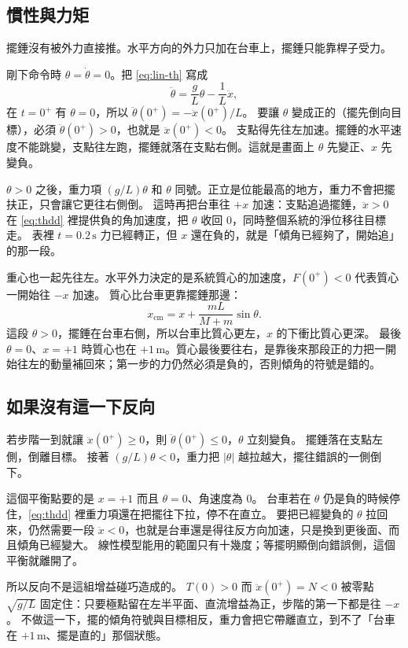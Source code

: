 \documentclass[12pt,a4paper]{article}
\begin{document}
\subsection{慣性與力矩}

擺錘沒有被外力直接推。水平方向的外力只加在台車上，擺錘只能靠桿子受力。

剛下命令時 \(\theta=\dot\theta=0\)。把 \eqref{eq:lin-th} 寫成
\begin{equation}
  \ddot\theta=\frac{g}{L}\theta-\frac{1}{L}\ddot x,
  \label{eq:thdd}
\end{equation}
在 \(t=0^+\) 有 \(\theta=0\)，所以 \(\ddot\theta(0^+)=-\ddot x(0^+)/L\)。
要讓 \(\theta\) 變成正的（擺先倒向目標），必須 \(\ddot\theta(0^+)>0\)，也就是 \(\ddot x(0^+)<0\)。
支點得先往左加速。擺錘的水平速度不能跳變，支點往左跑，擺錘就落在支點右側。這就是畫面上 \(\theta\) 先變正、\(x\) 先變負。

\(\theta>0\) 之後，重力項 \((g/L)\theta\) 和 \(\theta\) 同號。正立是位能最高的地方，重力不會把擺扶正，只會讓它更往右側倒。
這時再把台車往 \(+x\) 加速：支點追過擺錘，\(\ddot x>0\) 在 \eqref{eq:thdd} 裡提供負的角加速度，把 \(\theta\) 收回 0，同時整個系統的淨位移往目標走。
表裡 \(t=0.2\,\mathrm{s}\) 力已經轉正，但 \(x\) 還在負的，就是「傾角已經夠了，開始追」的那一段。

重心也一起先往左。水平外力決定的是系統質心的加速度，\(F(0^+)<0\) 代表質心一開始往 \(-x\) 加速。
質心比台車更靠擺錘那邊：
\[
  x_{\mathrm{cm}}=x+\frac{mL}{M+m}\sin\theta.
\]
這段 \(\theta>0\)，擺錘在台車右側，所以台車比質心更左，\(x\) 的下衝比質心更深。
最後 \(\theta=0\)、\(x=+1\) 時質心也在 \(+1\,\mathrm{m}\)。質心最後要往右，是靠後來那段正的力把一開始往左的動量補回來；第一步的力仍然必須是負的，否則傾角的符號是錯的。

\subsection{如果沒有這一下反向}

若步階一到就讓 \(\ddot x(0^+)\ge 0\)，則 \(\ddot\theta(0^+)\le 0\)，\(\theta\) 立刻變負。
擺錘落在支點左側，倒離目標。
接著 \((g/L)\theta<0\)，重力把 \(|\theta|\) 越拉越大，擺往錯誤的一側倒下。

這個平衡點要的是 \(x=+1\) 而且 \(\theta=0\)、角速度為 0。
台車若在 \(\theta\) 仍是負的時候停住，\eqref{eq:thdd} 裡重力項還在把擺往下拉，停不在直立。
要把已經變負的 \(\theta\) 拉回來，仍然需要一段 \(\ddot x<0\)，也就是台車還是得往反方向加速，只是換到更後面、而且傾角已經變大。
線性模型能用的範圍只有十幾度；等擺明顯倒向錯誤側，這個平衡就離開了。

所以反向不是這組增益碰巧造成的。
\(T(0)>0\) 而 \(\ddot x(0^+)=N<0\) 被零點 \(\sqrt{g/L}\) 固定住：只要極點留在左半平面、直流增益為正，步階的第一下都是往 \(-x\)。
不做這一下，擺的傾角符號與目標相反，重力會把它帶離直立，到不了「台車在 \(+1\,\mathrm{m}\)、擺是直的」那個狀態。
\end{document}
